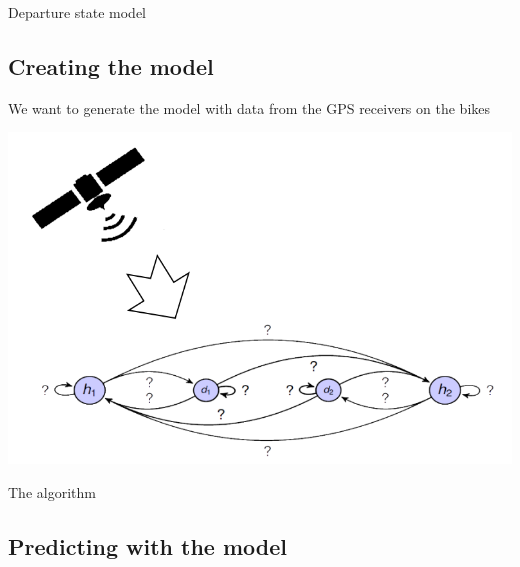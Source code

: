 \begin{frame}{Departure state model}

\end{frame}

\subsection{Creating the model}

\begin{frame}{}
	
\begin{center}
We want to generate the model with data from the GPS receivers on the bikes
	
\includegraphics[width=0.8\linewidth]{graphics/build_the_model}
\end{center}

\end{frame}

\begin{frame}{The algorithm}

\end{frame}

\subsection{Predicting with the model}

